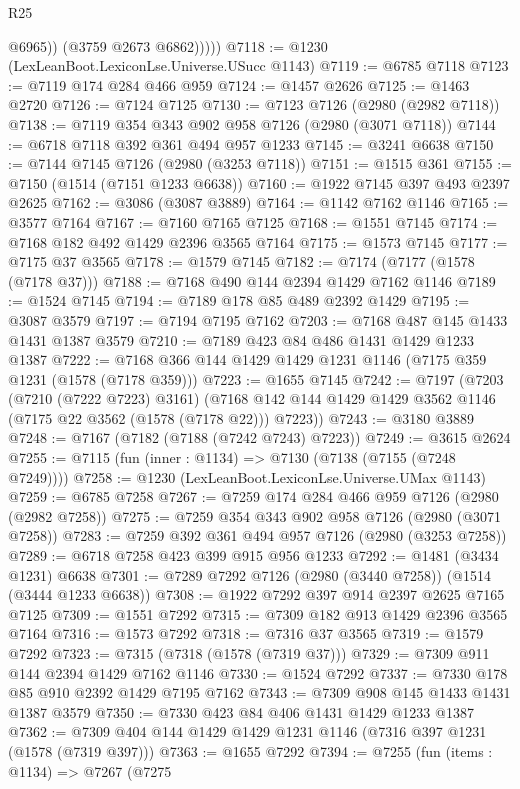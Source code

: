 \begin{lexlean}{R25}
\begin{coremodule}
                @6965))
            (@3759 @2673 @6862)))))
@7118 := @1230 (LexLeanBoot.LexiconLse.Universe.USucc @1143)
@7119 := @6785 @7118
@7123 := @7119 @174 @284 @466 @959
@7124 := @1457 @2626
@7125 := @1463 @2720
@7126 := @7124 @7125
@7130 := @7123 @7126 (@2980 (@2982 @7118))
@7138 := @7119 @354 @343 @902 @958 @7126 (@2980 (@3071 @7118))
@7144 := @6718 @7118 @392 @361 @494 @957 @1233
@7145 := @3241 @6638
@7150 := @7144 @7145 @7126 (@2980 (@3253 @7118))
@7151 := @1515 @361
@7155 := @7150 (@1514 (@7151 @1233 @6638))
@7160 := @1922 @7145 @397 @493 @2397 @2625
@7162 := @3086 (@3087 @3889)
@7164 := @1142 @7162 @1146
@7165 := @3577 @7164
@7167 := @7160 @7165 @7125
@7168 := @1551 @7145
@7174 := @7168 @182 @492 @1429 @2396 @3565 @7164
@7175 := @1573 @7145
@7177 := @7175 @37 @3565
@7178 := @1579 @7145
@7182 := @7174 (@7177 (@1578 (@7178 @37)))
@7188 := @7168 @490 @144 @2394 @1429 @7162 @1146
@7189 := @1524 @7145
@7194 := @7189 @178 @85 @489 @2392 @1429
@7195 := @3087 @3579
@7197 := @7194 @7195 @7162
@7203 := @7168 @487 @145 @1433 @1431 @1387 @3579
@7210 := @7189 @423 @84 @486 @1431 @1429 @1233 @1387
@7222 := @7168 @366 @144 @1429 @1429 @1231 @1146 (@7175 @359 @1231 (@1578 (@7178 @359)))
@7223 := @1655 @7145
@7242 := @7197
    (@7203
      (@7210 (@7222 @7223) @3161)
      (@7168 @142 @144 @1429 @1429 @3562 @1146 (@7175 @22 @3562 (@1578 (@7178 @22))) @7223))
@7243 := @3180 @3889
@7248 := @7167 (@7182 (@7188 (@7242 @7243) @7223))
@7249 := @3615 @2624
@7255 := @7115 (fun (inner : @1134) => @7130 (@7138 (@7155 (@7248 @7249))))
@7258 := @1230 (LexLeanBoot.LexiconLse.Universe.UMax @1143)
@7259 := @6785 @7258
@7267 := @7259 @174 @284 @466 @959 @7126 (@2980 (@2982 @7258))
@7275 := @7259 @354 @343 @902 @958 @7126 (@2980 (@3071 @7258))
@7283 := @7259 @392 @361 @494 @957 @7126 (@2980 (@3253 @7258))
@7289 := @6718 @7258 @423 @399 @915 @956 @1233
@7292 := @1481 (@3434 @1231) @6638
@7301 := @7289 @7292 @7126 (@2980 (@3440 @7258)) (@1514 (@3444 @1233 @6638))
@7308 := @1922 @7292 @397 @914 @2397 @2625 @7165 @7125
@7309 := @1551 @7292
@7315 := @7309 @182 @913 @1429 @2396 @3565 @7164
@7316 := @1573 @7292
@7318 := @7316 @37 @3565
@7319 := @1579 @7292
@7323 := @7315 (@7318 (@1578 (@7319 @37)))
@7329 := @7309 @911 @144 @2394 @1429 @7162 @1146
@7330 := @1524 @7292
@7337 := @7330 @178 @85 @910 @2392 @1429 @7195 @7162
@7343 := @7309 @908 @145 @1433 @1431 @1387 @3579
@7350 := @7330 @423 @84 @406 @1431 @1429 @1233 @1387
@7362 := @7309 @404 @144 @1429 @1429 @1231 @1146 (@7316 @397 @1231 (@1578 (@7319 @397)))
@7363 := @1655 @7292
@7394 := @7255
    (fun (items : @1134) =>
    @7267
      (@7275

\end{coremodule}
\end{lexlean}
